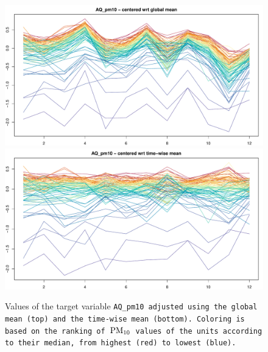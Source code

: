 \documentclass[12pt,	%
	a4paper,		%
	twoside,		%
	openright,		%
	titlepage,%
	]{book}
\theoremstyle{definition}
\begin{document}
\begin{figure}[!ht]
    \centering
    \includegraphics[width=1\linewidth]{Testing/Covariates/corollary images/AQ_pm10centered wrt global mean.pdf}
    \includegraphics[width=1\linewidth]{Testing/Covariates/corollary images/AQ_pm10centered wrt time-wise mean.pdf}
    \caption[Comparison of the two mean centering methods]{Values of the target variable \tt{AQ\_pm10} adjusted using the global mean (top) and the time-wise mean (bottom). Coloring is based on the ranking of $\text{PM}_{10}$ values of the units according to their median, from highest (red) to lowest (blue).}
    \label{fig:different means conceptions PM10}
\end{figure}
\end{document}
